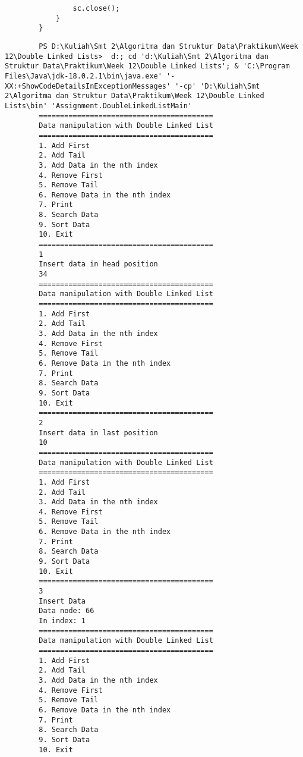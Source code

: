 \documentclass[12pt,titlepage]{article}
\begin{document}
\begin{enumerate}
\begin{verbatim}
                sc.close();
            }
        }

    \end{verbatim}

    \begin{verbatim}
        PS D:\Kuliah\Smt 2\Algoritma dan Struktur Data\Praktikum\Week 12\Double Linked Lists>  d:; cd 'd:\Kuliah\Smt 2\Algoritma dan Struktur Data\Praktikum\Week 12\Double Linked Lists'; & 'C:\Program Files\Java\jdk-18.0.2.1\bin\java.exe' '-XX:+ShowCodeDetailsInExceptionMessages' '-cp' 'D:\Kuliah\Smt 2\Algoritma dan Struktur Data\Praktikum\Week 12\Double Linked Lists\bin' 'Assignment.DoubleLinkedListMain' 
        =========================================
        Data manipulation with Double Linked List
        =========================================
        1. Add First
        2. Add Tail
        3. Add Data in the nth index
        4. Remove First
        5. Remove Tail
        6. Remove Data in the nth index
        7. Print
        8. Search Data
        9. Sort Data
        10. Exit
        =========================================
        1
        Insert data in head position
        34
        =========================================
        Data manipulation with Double Linked List
        =========================================
        1. Add First
        2. Add Tail
        3. Add Data in the nth index
        4. Remove First
        5. Remove Tail
        6. Remove Data in the nth index
        7. Print
        8. Search Data
        9. Sort Data
        10. Exit
        =========================================
        2
        Insert data in last position
        10
        =========================================
        Data manipulation with Double Linked List
        =========================================
        1. Add First
        2. Add Tail
        3. Add Data in the nth index
        4. Remove First
        5. Remove Tail
        6. Remove Data in the nth index
        7. Print
        8. Search Data
        9. Sort Data
        10. Exit
        =========================================
        3
        Insert Data
        Data node: 66
        In index: 1
        =========================================
        Data manipulation with Double Linked List
        =========================================
        1. Add First
        2. Add Tail
        3. Add Data in the nth index
        4. Remove First
        5. Remove Tail
        6. Remove Data in the nth index
        7. Print
        8. Search Data
        9. Sort Data
        10. Exit

\end{verbatim}
\end{enumerate}
\end{document}
